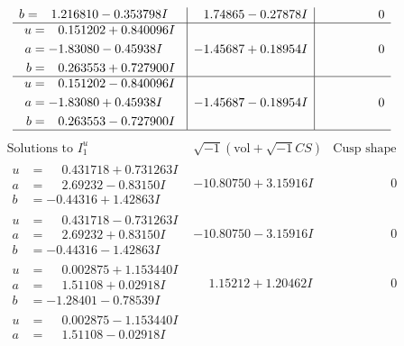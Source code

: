 \documentclass[1p]{elsarticle_modified}
\theoremstyle{definition}
\newcommand{\I}{\sqrt{-1}}
\begin{document}
$$\begin{array}{c|c|c}
\begin{aligned}
b &= \phantom{-}1.216810 - 0.353798 I\end{aligned}
 & \phantom{-}1.74865 - 0.27878 I & \phantom{-0.000000 } 0 \\ \hline\begin{aligned}
u &= \phantom{-}0.151202 + 0.840096 I \\
a &= -1.83080 - 0.45938 I \\
b &= \phantom{-}0.263553 + 0.727900 I\end{aligned}
 & -1.45687 + 0.18954 I & \phantom{-0.000000 } 0 \\ \hline\begin{aligned}
u &= \phantom{-}0.151202 - 0.840096 I \\
a &= -1.83080 + 0.45938 I \\
b &= \phantom{-}0.263553 - 0.727900 I\end{aligned}
 & -1.45687 - 0.18954 I & \phantom{-0.000000 } 0\\
 \hline 
 \end{array}$$\newpage$$\begin{array}{c|c|c}  
\text{Solutions to }I^u_{1}& \I (\text{vol} + \sqrt{-1}CS) & \text{Cusp shape}\\
 \hline 
\begin{aligned}
u &= \phantom{-}0.431718 + 0.731263 I \\
a &= \phantom{-}2.69232 - 0.83150 I \\
b &= -0.44316 + 1.42863 I\end{aligned}
 & -10.80750 + 3.15916 I & \phantom{-0.000000 } 0 \\ \hline\begin{aligned}
u &= \phantom{-}0.431718 - 0.731263 I \\
a &= \phantom{-}2.69232 + 0.83150 I \\
b &= -0.44316 - 1.42863 I\end{aligned}
 & -10.80750 - 3.15916 I & \phantom{-0.000000 } 0 \\ \hline\begin{aligned}
u &= \phantom{-}0.002875 + 1.153440 I \\
a &= \phantom{-}1.51108 + 0.02918 I \\
b &= -1.28401 - 0.78539 I\end{aligned}
 & \phantom{-}1.15212 + 1.20462 I & \phantom{-0.000000 } 0 \\ \hline\begin{aligned}
u &= \phantom{-}0.002875 - 1.153440 I \\
a &= \phantom{-}1.51108 - 0.02918 I \\

\end{aligned}
\end{array}$$
\end{document}
